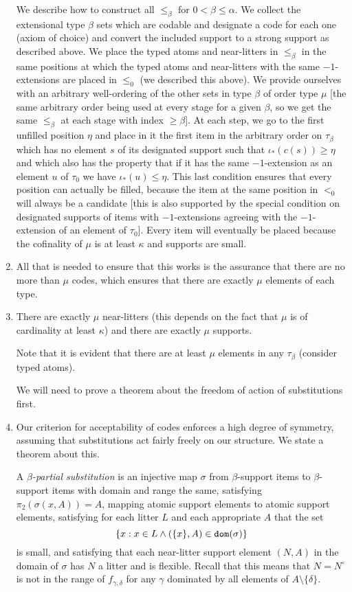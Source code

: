 \documentclass[12pt]{article}
\begin{document}
\begin{enumerate}
We describe how to construct all $\leq_\beta$ for $0<\beta \leq \alpha$.  We collect the extensional type $\beta$ sets which are codable and designate a code for each one (axiom of choice) and convert the included support to a strong support as described above. We place the typed atoms and near-litters  in $\leq_\beta$ in the same positions at which the typed atoms and near-litters with the same $-1$-extensions are placed in
$\leq_0$ (we described this above).  We provide ourselves with an arbitrary well-ordering of the other sets in type $\beta$ of order type $\mu$ [the same arbitrary order being used at every stage for a given $\beta$, so we get the same $\leq_\beta$ at each stage with index $\geq\beta$].  At each step, we go to the first unfilled position $\eta$ and place in it the first item in the arbitrary order on $\tau_\beta$ which has no element $s$ of its designated support such that $\iota_*(c(s))\geq \eta$ and which also has the property that
if it has the same $-1$-extension as an element $u$ of $\tau_0$ we have $\iota_*(u) \leq \eta$.  This last condition ensures that every position can actually be filled, because the item at the same position in $<_0$ will always be a candidate [this is also supported by the special condition on designated supports of items with $-1$-extensions agreeing with the $-1$-extension of an element of $\tau_0$].  Every item will eventually be placed because the cofinality of $\mu$ is at least $\kappa$ and supports are small.

\item All that is needed to ensure that this works is the assurance that there are no more than $\mu$ codes, which ensures that there are exactly $\mu$ elements of each type.

\item  There are exactly $\mu$ near-litters (this depends on the fact that $\mu$ is of cardinality at least $\kappa$) and there are exactly $\mu$ supports.

Note that it is evident that there are at least $\mu$ elements in any $\tau_\beta$ (consider typed atoms).

We will need to prove a theorem about the freedom of action of substitutions first.

\item Our criterion for acceptability of codes enforces a high degree of symmetry, assuming that substitutions act fairly freely on our structure.  We state a theorem about this.

A {\em $\beta$-partial substitution\/} is an injective map $\sigma$ from $\beta$-support items to $\beta$-support items with domain and range the same, satisfying $\pi_2(\sigma(x,A)) = A$, mapping atomic support elements to atomic support elements, satisfying for each litter $L$ and each appropriate $A$ that the set $$\{x: x \in L \wedge (\{x\},A) \in {\tt dom}(\sigma)\}$$ is small, and satisfying that each near-litter support element $(N,A)$
in the domain of $\sigma$ has $N$ a litter and is flexible.  Recall that this means that $N=N^\circ$ is not in the range of $f_{\gamma,\delta}$ for any $\gamma$ dominated by all elements of $A \setminus \{\delta\}$.


\end{enumerate}
\end{document}
